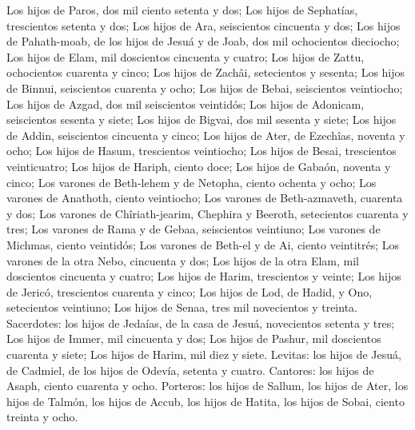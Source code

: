  Los hijos de Paros, dos mil ciento setenta y dos;
 Los hijos de Sephatías, trescientos setenta y dos;
 Los hijos de Ara, seiscientos cincuenta y dos;
 Los hijos de Pahath-moab, de los hijos de Jesuá y de
Joab, dos mil ochocientos dieciocho;  Los hijos de Elam,
mil doscientos cincuenta y cuatro;  Los hijos de Zattu,
ochocientos cuarenta y cinco;  Los hijos de Zachâi,
setecientos y sesenta;  Los hijos de Binnui, seiscientos
cuarenta y ocho;  Los hijos de Bebai, seiscientos
veintiocho;  Los hijos de Azgad, dos mil seiscientos
veintidós;  Los hijos de Adonicam, seiscientos sesenta y
siete;  Los hijos de Bigvai, dos mil sesenta y siete;
 Los hijos de Addin, seiscientos cincuenta y cinco;
 Los hijos de Ater, de Ezechîas, noventa y ocho;
 Los hijos de Hasum, trescientos veintiocho;
 Los hijos de Besai, trescientos veinticuatro;
 Los hijos de Hariph, ciento doce;  Los
hijos de Gabaón, noventa y cinco;  Los varones de
Beth-lehem y de Netopha, ciento ochenta y ocho;  Los
varones de Anathoth, ciento veintiocho;  Los varones de
Beth-azmaveth, cuarenta y dos;  Los varones de
Chîriath-jearim, Chephira y Beeroth, setecientos cuarenta y tres;
 Los varones de Rama y de Gebaa, seiscientos veintiuno;
 Los varones de Michmas, ciento veintidós;
 Los varones de Beth-el y de Ai, ciento veintitrés;
 Los varones de la otra Nebo, cincuenta y dos;
 Los hijos de la otra Elam, mil doscientos cincuenta y
cuatro;  Los hijos de Harim, trescientos y veinte;
 Los hijos de Jericó, trescientos cuarenta y cinco;
 Los hijos de Lod, de Hadid, y Ono, setecientos
veintiuno;  Los hijos de Senaa, tres mil novecientos y
treinta.  Sacerdotes: los hijos de Jedaías, de la casa de
Jesuá, novecientos setenta y tres;  Los hijos de Immer,
mil cincuenta y dos;  Los hijos de Pashur, mil doscientos
cuarenta y siete;  Los hijos de Harim, mil diez y siete.
 Levitas: los hijos de Jesuá, de Cadmiel, de los hijos de
Odevía, setenta y cuatro.  Cantores: los hijos de Asaph,
ciento cuarenta y ocho.  Porteros: los hijos de Sallum,
los hijos de Ater, los hijos de Talmón, los hijos de Accub, los hijos de
Hatita, los hijos de Sobai, ciento treinta y ocho.

